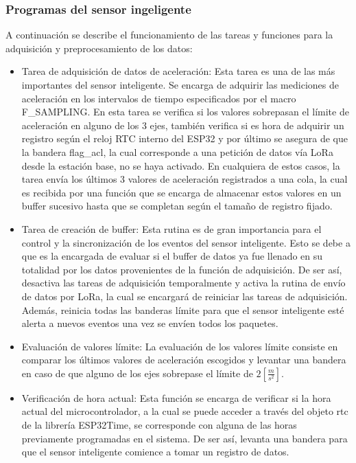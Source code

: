 \subsubsection{Programas del sensor ingeligente}

A continuación se describe el funcionamiento de las tareas y funciones para la adquisición y preprocesamiento de los datos:

\begin{itemize}
    \item Tarea de adquisición de datos de aceleración: Esta tarea es una de las más importantes del sensor inteligente. Se encarga de adquirir las mediciones de aceleración en los intervalos de tiempo especificados por el macro F\_SAMPLING. En esta tarea se verifica si los valores sobrepasan el límite de aceleración en alguno de los 3 ejes, también verifica si es hora de adquirir un registro según el reloj RTC interno del ESP32 y por último se asegura de que la bandera flag\_acl, la cual corresponde a una petición de datos vía LoRa desde la estación base, no se haya activado. En cualquiera de estos casos, la tarea envía los últimos 3 valores de aceleración registrados a una cola, la cual es recibida por una función que se encarga de almacenar estos valores en un buffer sucesivo hasta que se completan según el tamaño de registro fijado.
    
    \item Tarea de creación de buffer: Esta rutina es de gran importancia para el control y la sincronización de los eventos del sensor inteligente. Esto se debe a que es la encargada de evaluar si el buffer de datos ya fue llenado en su totalidad por los datos provenientes de la función de adquisición. De ser así, desactiva las tareas de adquisición temporalmente y activa la rutina de envío de datos por LoRa, la cual se encargará de reiniciar las tareas de adquisición. Además, reinicia todas las banderas límite para que el sensor inteligente esté alerta a nuevos eventos una vez se envíen todos los paquetes. 

    \item Evaluación de valores límite: La evaluación de los valores límite consiste en comparar los últimos valores de aceleración escogidos y levantar una bandera en caso de que alguno de los ejes sobrepase el límite de $2 [\frac{m}{s^2}]$.
    
    \item Verificación de hora actual: Esta función se encarga de verificar si la hora actual del microcontrolador, a la cual se puede acceder a través del objeto rtc de la librería ESP32Time, se corresponde con alguna de las horas previamente programadas en el sistema. De ser así, levanta una bandera para que el sensor inteligente comience a tomar un registro de datos.
    

\end{itemize}
